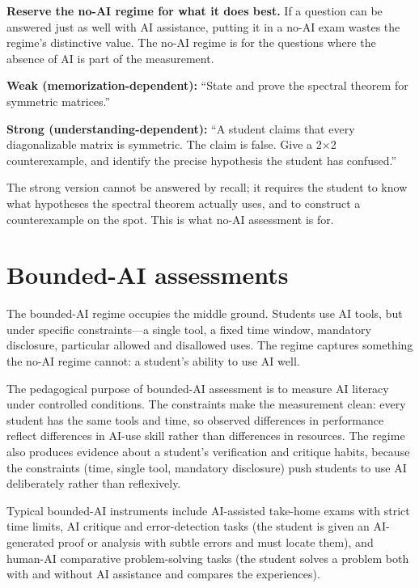 \documentclass[11pt]{book}
\begin{document}
\textbf{Reserve the no-AI regime for what it does best.} If a question can be answered just as well with AI assistance, putting it in a no-AI exam wastes the regime's distinctive value. The no-AI regime is for the questions where the absence of AI is part of the measurement.

\begin{example}
\textbf{Weak (memorization-dependent):} ``State and prove the spectral theorem for symmetric matrices.''

\medskip
\textbf{Strong (understanding-dependent):} ``A student claims that every diagonalizable matrix is symmetric. The claim is false. Give a 2$\times$2 counterexample, and identify the precise hypothesis the student has confused.''

\medskip
The strong version cannot be answered by recall; it requires the student to know what hypotheses the spectral theorem actually uses, and to construct a counterexample on the spot. This is what no-AI assessment is for.
\end{example}

\section{Bounded-AI assessments}

The bounded-AI regime occupies the middle ground. Students use AI tools, but under specific constraints---a single tool, a fixed time window, mandatory disclosure, particular allowed and disallowed uses. The regime captures something the no-AI regime cannot: a student's ability to use AI well.

The pedagogical purpose of bounded-AI assessment is to measure AI literacy under controlled conditions. The constraints make the measurement clean: every student has the same tools and time, so observed differences in performance reflect differences in AI-use skill rather than differences in resources. The regime also produces evidence about a student's verification and critique habits, because the constraints (time, single tool, mandatory disclosure) push students to use AI deliberately rather than reflexively.

Typical bounded-AI instruments include AI-assisted take-home exams with strict time limits, AI critique and error-detection tasks (the student is given an AI-generated proof or analysis with subtle errors and must locate them), and human-AI comparative problem-solving tasks (the student solves a problem both with and without AI assistance and compares the experiences).
\end{document}
